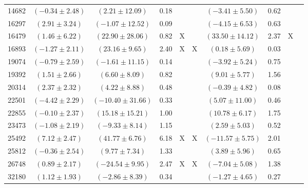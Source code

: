 \documentclass [10pt, twoside] {uwthesis}[2012/04/02]
\begin{document}
{\begin{longtable}[t]{|c|c|cccc|cccc|}
14682	&  $(	-0.34	  \pm  	2.48	)$  &  $(	2.21	  \pm  	12.09	)$  &  	0.18	  &  		  &  		  &  $(	-3.41	  \pm  	5.50	)$  &  	0.62	  &  		  &  		  \\
16297	&  $(	2.91	  \pm  	3.24	)$  &  $(	-1.07	  \pm  	12.52	)$  &  	0.09	  &  		  &  		  &  $(	-4.15	  \pm  	6.53	)$  &  	0.63	  &  		  &  		  \\
16479	&  $(	1.46	  \pm  	6.22	)$  &  $(	22.90	  \pm  	28.06	)$  &  	0.82	  &  	X	  &  		  &  $(	33.50	  \pm  	14.12	)$  &  	2.37	  &  	X	  &  		  \\
16893	&  $(	-1.27	  \pm  	2.11	)$  &  $(	23.16	  \pm  	9.65	)$  &  	2.40	  &  	X	  &  	X	  &  $(	0.18	  \pm  	5.69	)$  &  	0.03	  &  		  &  		  \\
19074	&  $(	-0.79	  \pm  	2.59	)$  &  $(	-1.61	  \pm  	11.15	)$  &  	0.14	  &  		  &  		  &  $(	-3.92	  \pm  	5.24	)$  &  	0.75	  &  		  &  		  \\
19392	&  $(	1.51	  \pm  	2.66	)$  &  $(	6.60	  \pm  	8.09	)$  &  	0.82	  &  		  &  		  &  $(	9.01	  \pm  	5.77	)$  &  	1.56	  &  		  &  		  \\
20314	&  $(	2.37	  \pm  	2.32	)$  &  $(	4.22	  \pm  	8.88	)$  &  	0.48	  &  		  &  		  &  $(	-0.39	  \pm  	4.82	)$  &  	0.08	  &  		  &  		  \\
22501	&  $(	-4.42	  \pm  	2.29	)$  &  $(	-10.40	  \pm  	31.66	)$  &  	0.33	  &  		  &  		  &  $(	5.07	  \pm  	11.00	)$  &  	0.46	  &  		  &  		  \\
22855	&  $(	-0.10	  \pm  	2.37	)$  &  $(	15.18	  \pm  	15.21	)$  &  	1.00	  &  		  &  		  &  $(	10.78	  \pm  	6.17	)$  &  	1.75	  &  		  &  		  \\
23473	&  $(	-1.08	  \pm  	2.19	)$  &  $(	-9.33	  \pm  	8.14	)$  &  	1.15	  &  		  &  		  &  $(	2.59	  \pm  	5.03	)$  &  	0.52	  &  		  &  		  \\
25492	&  $(	7.12	  \pm  	2.47	)$  &  $(	41.77	  \pm  	6.76	)$  &  	6.18	  &  	X	  &  	X	  &  $(	-11.57	  \pm  	5.75	)$  &  	2.01	  &  		  &  		  \\
25812	&  $(	-0.36	  \pm  	2.54	)$  &  $(	9.77	  \pm  	7.34	)$  &  	1.33	  &  		  &  		  &  $(	3.89	  \pm  	5.96	)$  &  	0.65	  &  		  &  		  \\
26748	&  $(	0.89	  \pm  	2.17	)$  &  $(	-24.54	  \pm  	9.95	)$  &  	2.47	  &  	X	  &  	X	  &  $(	-7.04	  \pm  	5.08	)$  &  	1.38	  &  		  &  		  \\
32180	&  $(	1.12	  \pm  	1.93	)$  &  $(	-2.86	  \pm  	8.39	)$  &  	0.34	  &  		  &  		  &  $(	-1.27	  \pm  	4.65	)$  &  	0.27	  &  		  &  		  \\

\end{longtable}}
\end{document}

